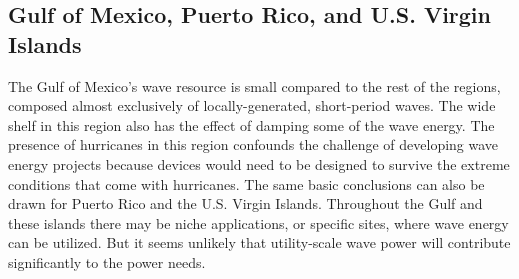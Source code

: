 \subsection{Gulf of Mexico, Puerto Rico, and U.S. Virgin Islands}

The Gulf of Mexico's wave resource is small compared to the rest of the regions, composed almost exclusively of locally-generated, short-period waves. The wide shelf in this region also has the effect of damping some of the wave energy. The presence of hurricanes in this region confounds the challenge of developing wave energy projects because devices would need to be designed to survive the extreme conditions that come with hurricanes. The same basic conclusions can also be drawn for Puerto Rico and the U.S. Virgin Islands. Throughout the Gulf and these islands there may be niche applications, or specific sites, where wave energy can be utilized. But it seems unlikely that utility-scale wave power will contribute significantly to the power needs.





